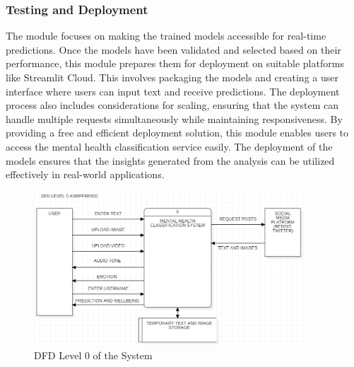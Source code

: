 \subsubsection{Testing and Deployment}
\noindent
The module focuses on making the trained models accessible for real-time predictions. Once the models have been validated and selected based on their performance, this module prepares them for deployment on suitable platforms like Streamlit Cloud. This involves packaging the models and creating a user interface where users can input text and receive predictions. The deployment process also includes considerations for scaling, ensuring that the system can handle multiple requests simultaneously while maintaining responsiveness. By providing a free and efficient deployment solution, this module enables users to access the mental health classification service easily. The deployment of the models ensures that the insights generated from the analysis can be utilized effectively in real-world applications.

\begin{figure}[h!]  
    \centering
    \includegraphics[width=0.9\textwidth]{Images/DFD L0.png}  
    \caption{DFD Level 0 of the System}
    \label{dfdl0}  %
\end{figure}


